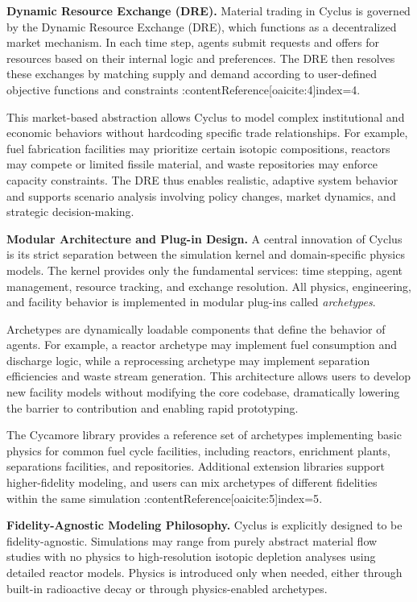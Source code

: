 \textbf{Dynamic Resource Exchange (DRE).}  
Material trading in Cyclus is governed by the Dynamic Resource Exchange (DRE), which functions as a decentralized market mechanism. 
In each time step, agents submit requests and offers for resources based on their internal logic and preferences. The DRE then 
resolves these exchanges by matching supply and demand according to user-defined objective functions and constraints 
:contentReference[oaicite:4]{index=4}.

This market-based abstraction allows Cyclus to model complex institutional and economic behaviors without hardcoding specific 
trade relationships. For example, fuel fabrication facilities may prioritize certain isotopic compositions, reactors may compete 
or limited fissile material, and waste repositories may enforce capacity constraints. The DRE thus enables realistic, adaptive 
system behavior and supports scenario analysis involving policy changes, market dynamics, and strategic decision-making.

\textbf{Modular Architecture and Plug-in Design.}  
A central innovation of Cyclus is its strict separation between the simulation kernel and domain-specific physics models. The 
kernel provides only the fundamental services: time stepping, agent management, resource tracking, and exchange resolution. 
All physics, engineering, and facility behavior is implemented in modular plug-ins called \emph{archetypes}.

Archetypes are dynamically loadable components that define the behavior of agents. For example, a reactor archetype may 
implement fuel consumption and discharge logic, while a reprocessing archetype may implement separation efficiencies and 
waste stream generation. This architecture allows users to develop new facility models without modifying the core codebase, 
dramatically lowering the barrier to contribution and enabling rapid prototyping.

The Cycamore library provides a reference set of archetypes implementing basic physics for common fuel cycle facilities, 
including reactors, enrichment plants, separations facilities, and repositories. Additional extension libraries support 
higher-fidelity modeling, and users can mix archetypes of different fidelities within the same simulation 
:contentReference[oaicite:5]{index=5}.

\textbf{Fidelity-Agnostic Modeling Philosophy.}  
Cyclus is explicitly designed to be fidelity-agnostic. Simulations may range from purely abstract material flow 
studies with no physics to high-resolution isotopic depletion analyses using detailed reactor models. Physics is 
introduced only when needed, either through built-in radioactive decay or through physics-enabled archetypes.

